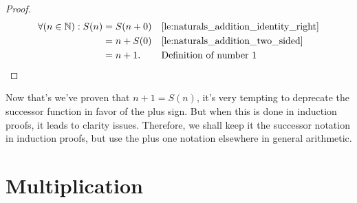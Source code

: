 \begin{proof}
  \begin{align}
    \forall (n \in \mathbb{N}) : S(n) & = S(n + 0) &  & \textrm{\Cref{le:naturals_addition_identity_right}} \\
                                      & = n + S(0) &  & \textrm{\Cref{le:naturals_addition_two_sided}}      \\
                                      & = n + 1.   &  & \textrm{Definition of number \(1\)} \qedhere
  \end{align}
\end{proof}

Now that's we've proven that \(n + 1 = S(n)\), it's very tempting to deprecate the successor
function in favor of the plus sign. But when this is done in induction proofs, it leads to clarity
issues. Therefore, we shall keep it the successor notation in induction proofs, but use the plus one
notation elsewhere in general arithmetic.

\section{Multiplication}
\label{sec:naturals_multiplication}


